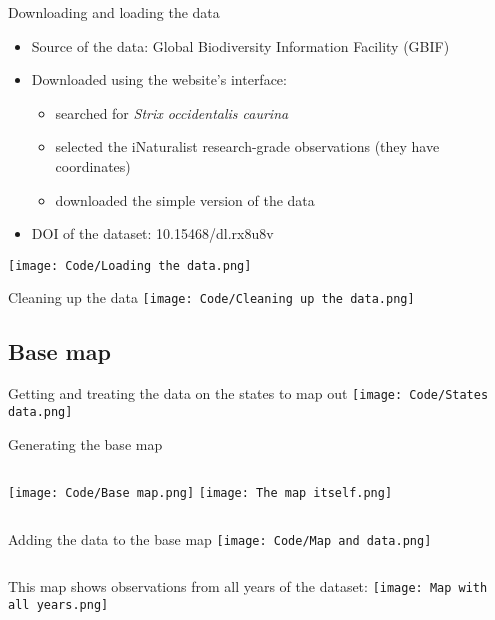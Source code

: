 \documentclass{beamer}
\begin{document}
\begin{frame}{Downloading and loading the data}
    \begin{itemize}
        \item Source of the data: Global Biodiversity Information Facility (GBIF)
        \item Downloaded using the website's interface:
            \begin{itemize}
                \item searched for \textit{Strix occidentalis caurina}
                \item selected the iNaturalist research-grade observations (they have coordinates)
                \item downloaded the simple version of the data
            \end{itemize}
        \item DOI of the dataset: 10.15468/dl.rx8u8v
    \end{itemize}
    \texttt{[image: Code/Loading the data.png]}
\end{frame}

\begin{frame}{Cleaning up the data}
    \texttt{[image: Code/Cleaning up the data.png]}
\end{frame}

\subsection{Base map}

\begin{frame}{Getting and treating the data on the states to map out}
    \texttt{[image: Code/States data.png]}
\end{frame}

\begin{frame}{Generating the base map}
    \begin{columns}
            \texttt{[image: Code/Base map.png]}
            \texttt{[image: The map itself.png]}
    \end{columns}    
\end{frame}

\begin{frame}{Adding the data to the base map}
    \texttt{[image: Code/Map and data.png]}
    \begin{columns}
            This map shows observations from all years of the dataset:
            \texttt{[image: Map with all years.png]}
    \end{columns}
\end{frame}
\end{document}
